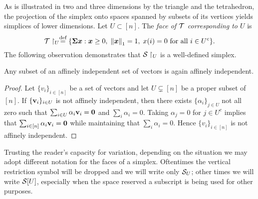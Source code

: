 As is illustrated in two and three dimensions by the triangle and the tetrahedron, the projection of the simplex onto spaces spanned by subsets of its vertices yields simplices of lower dimensions. Let $U\subset [n]$. The \emph{face of $\mathcal{T}$ corresponding to $U$} is 
\begin{equation}
\label{eq:T_U}
    \mathcal{T}\restriction_U \overset{\text{def}}{=} \{\boldsymbol{\Sigma}\vb*{x}: \vb*{x}\geq 0,\;\norm{\vb*{x}}_1=1,\;x(i)=0\text{ for all }i\in U^c\}.
\end{equation}
The following observation demonstrates that $\mathcal{S}\restriction_U$ is a well-defined simplex. 
\begin{observation}
	\label{obs:subset_affinely_independent}
	Any subset of an affinely independent set of vectors is again affinely independent. 
\end{observation}
\begin{proof}
	Let $\{v_i\}_{i\in[n]}$ be a set of vectors and let $U\subsetneq[n]$ be a proper subset of $[n]$. If $\{\vb{v}_i\}_{i\in U}$ is not affinely independent, then there exists $\{\alpha_i\}_{j\in U}$ not all zero such that $\sum_{i\in U}\alpha_i\vb{v}_i=\vb{0}$ and $\sum_i\alpha_i=0$. Taking $\alpha_j=0$ for $j\in U^c$ implies that $\sum_{i\in[n]}\alpha_i\vb{v}_i=\vb{0}$ while maintaining that $\sum_{i}\alpha_i=0$. Hence $\{v_i\}_{i\in[n]}$ is not affinely independent. 
\end{proof}

Trusting the reader's capacity for variation, depending on the situation we may adopt different notation for the faces of a simplex. Oftentimes the vertical restriction symbol will be dropped and we will write only $\mathcal{S}_U$; other times we will write $\mathcal{S}[U]$, especially when the space reserved a subscript is being used for other purposes. 


